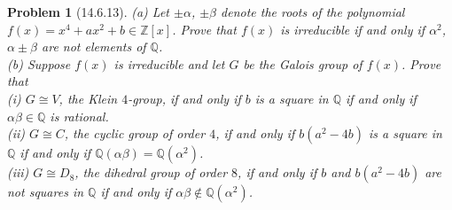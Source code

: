 \documentclass{article}
\newtheorem{problem}{Problem}
\begin{document}
\begin{problem}[14.6.13]
(a) Let $\pm \alpha$, $\pm \beta$ denote the roots of the polynomial $f(x) = x^4 + ax^2 + b \in \mathbb{Z}[x]$. Prove that $f(x)$ is irreducible if and only if $\alpha^2$, $\alpha \pm \beta$ are not elements of $\mathbb{Q}$.\\
(b) Suppose $f(x)$ is irreducible and let $G$ be the Galois group of $f(x)$. Prove that\\
(i) $G \cong V$, the Klein $4$-group, if and only if $b$ is a square in $\mathbb{Q}$ if and only if $\alpha \beta \in \mathbb{Q}$ is rational.\\
(ii) $G \cong C$, the cyclic group of order $4$, if and only if $b(a^2 - 4b)$ is a square in $\mathbb{Q}$ if and only if $\mathbb{Q}(\alpha \beta) = \mathbb{Q}(\alpha^2)$.\\
(iii) $G \cong D_8$, the dihedral group of order $8$, if and only if $b$ and $b(a^2 - 4b)$ are not squares in $\mathbb{Q}$ if and only if $\alpha \beta \notin \mathbb{Q}(\alpha^2)$.
\end{problem}
\end{document}
